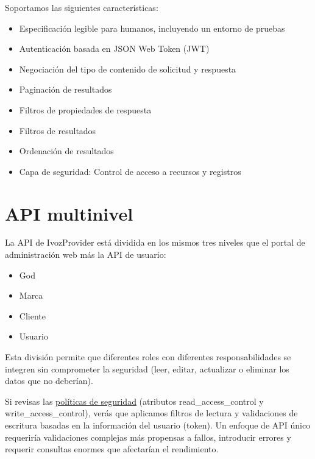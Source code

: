 \documentclass[letterpaper,10pt,spanish]{sphinxmanual}
\begin{document}
Soportamos las siguientes características:
\begin{itemize}
\item {} 
Especificación legible para humanos, incluyendo un entorno de pruebas

\item {} 
Autenticación basada en JSON Web Token (JWT)

\item {} 
Negociación del tipo de contenido de solicitud y respuesta

\item {} 
Paginación de resultados

\item {} 
Filtros de propiedades de respuesta

\item {} 
Filtros de resultados

\item {} 
Ordenación de resultados

\item {} 
Capa de seguridad: Control de acceso a recursos y registros

\end{itemize}


\chapter{API multinivel}
\label{api_rest/multilevel::doc}\label{api_rest/multilevel:multi-level-api}
La API de IvozProvider está dividida en los mismos tres niveles que el portal de administración web más la API de usuario:
\begin{itemize}
\item {} 
God

\item {} 
Marca

\item {} 
Cliente

\item {} 
Usuario

\end{itemize}

Esta división permite que diferentes roles con diferentes responsabilidades se integren sin comprometer la seguridad (leer, editar, actualizar o eliminar los datos que no deberían).

Si revisas las \href{https://github.com/irontec/ivozprovider/blob/bleeding/web/rest/brand/config/api/raw/provider.yml}{políticas de seguridad} (atributos read\_access\_control y write\_access\_control), verás que aplicamos filtros de lectura y validaciones de escritura basadas en la información del usuario (token). Un enfoque de API único requeriría validaciones complejas más propensas a fallos, introducir errores y requerir consultas enormes que afectarían el rendimiento.
\end{document}
